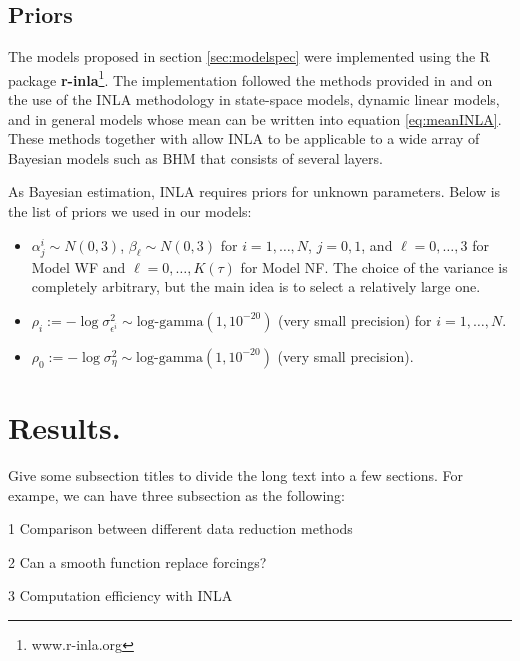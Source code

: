 \documentclass[11pt]{amsart}
\theoremstyle{plain}
\theoremstyle{definition}
\theoremstyle{remark}
\begin{document}
\subsection{Priors}
The models proposed in section \ref{sec:modelspec} were
implemented using the R package \textbf{r-inla}\footnote{www.r-inla.org}. The
implementation followed the methods provided in \cite{Ruiz-Cardenas2012} and
\cite{Muff2015} on the use of the INLA methodology in state-space models,
dynamic linear models, and in general models whose mean can be written
into equation \eqref{eq:meanINLA}. These
methods together with \cite{Martins2013} allow INLA to be applicable to a wide array of Bayesian models such as BHM that consists of several layers. 

As Bayesian estimation, INLA requires priors for unknown parameters. Below is the list of priors we used in our models:
\begin{itemize}
\item $\alpha^i_j\sim N(0,3)$, $\beta_\ell \sim N(0,3)$ for $i=1,\ldots,N$, $j=0,1$, and  $\ell=0,\ldots,3$
  for Model WF and $\ell=0,\ldots,K(\tau)$ for Model NF. The choice of the variance is
  completely arbitrary, but the main idea is to select a relatively large one.
  
\item $\rho_i := -\log \sigma^2_{\epsilon^i}\sim \text{log-gamma}(1,10^{-20})$
  (very small precision) for $i=1,\ldots,N$.
  
\item $\rho_0 := -\log \sigma^2_\eta \sim \text{log-gamma}(1,10^{-20})$ (very
  small precision).
\end{itemize}


\section{Results.}
\label{sec:results}
Give some subsection titles to divide the long text into a few sections. For exampe, we can have three subsection as the following:

1 Comparison between different data reduction methods

2 Can a smooth function replace forcings?

3 Computation efficiency with INLA
\end{document}
